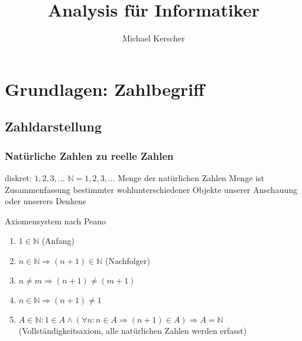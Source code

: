\documentclass[a4paper,10pt]{book}
\title{Analysis für Informatiker}
\author{Michael Kerscher}
\begin{document}
\maketitle


\chapter{Grundlagen: Zahlbegriff}
\section{Zahldarstellung}
\subsection{Natürliche Zahlen zu reelle Zahlen}
diskret: $1,2,3,...$
$\mathbb{N} = {1,2,3,...}$ Menge der natürlichen Zahlen
 Menge ist Zusammenfassung bestimmter wohlunterschiedener Objekte unserer Anschauung oder unserers Denkens

Axiomensystem nach Peano
\begin{enumerate}
 \item $1 \in \mathbb{N}$ (Anfang)
 \item $n \in \mathbb{N} \Rightarrow (n+1) \in \mathbb{N}$ (Nachfolger)
 \item $n \neq m \Rightarrow (n+1) \neq (m+1)$
 \item $n \in \mathbb{N} \Rightarrow (n+1) \neq 1$
 \item $A \in \mathbb{N}: 1 \in A \land (\forall n: n \in A \Rightarrow (n+1) \in A) \Rightarrow A = \mathbb{N}$ (Vollständigkeitsaxiom, alle natürlichen Zahlen werden erfasst)
\end{enumerate}
\end{document}
